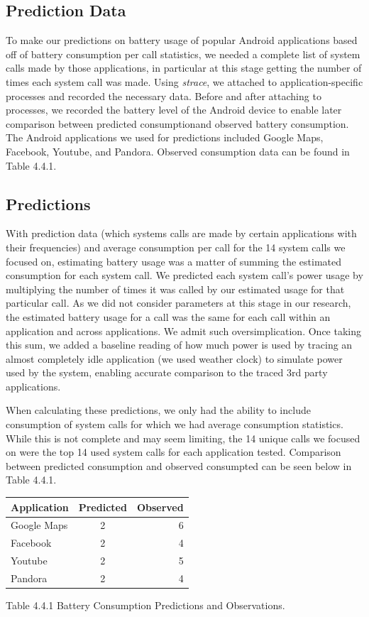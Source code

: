 \documentclass[11pt]{article}
\begin{document}
\subsection{Prediction Data}

To make our predictions on battery usage of popular Android applications based off of battery consumption per call statistics,
we needed a complete list of system calls made by those applications, in particular at this stage getting the number of times 
each system call was made.  Using \textit{strace}, we attached to application-specific processes and recorded the necessary data. 
Before and after attaching to processes, we recorded the battery level of the Android device to enable later comparison between 
predicted consumptionand observed battery consumption.  The Android applications we used for predictions included Google Maps, 
Facebook, Youtube, and Pandora.  Observed consumption data can be found in Table 4.4.1.

\subsection{Predictions}

With prediction data (which systems calls are made by certain applications with their frequencies) and average consumption per
call for the 14 system calls we focused on, estimating battery usage was a matter of summing the estimated consumption for each 
system call.  We predicted each system call's power usage by multiplying the number of times it was called by our estimated 
usage for that particular call.  As we did not consider parameters at this stage in our research, the estimated battery usage for a 
call was the same for each call within an application and across applications.  We admit such oversimplication.  Once taking this sum, we added a baseline reading of how much power is used by tracing an almost completely idle application (we used weather clock) to simulate power used by the system, enabling accurate comparison to the traced 3rd party applications. 

When calculating these predictions, we only had the ability to include consumption of system calls for which we had average consumption statistics.  
While this is not complete and may seem limiting, the 14 unique calls we focused on were the top 14 used system calls for each application tested.  Comparison between predicted consumption and observed consumpted can be seen below in Table 4.4.1.

\begin{tabular}{l c r}
   Application & Predicted & Observed \\
   \hline
   Google Maps & 2 & 6 \\
   Facebook & 2 & 4 \\
   Youtube & 2 & 5 \\
   Pandora & 2 & 4 \\
\end{tabular}
\newline        
{\fontsize{11}{13}\selectfont Table 4.4.1 Battery Consumption Predictions and Observations.}
\newline
\end{document}
